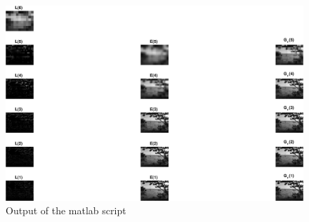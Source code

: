 \documentclass[DIN, pagenumber=false, fontsize=11pt, parskip=half]{scrartcl}
\begin{document}
    \subsection{}
    
    \begin{figure}[H]
        \centering
        \includegraphics[width=\textwidth]{sh05ex02_2.eps}
        \caption{Output of the matlab script}
    \end{figure}
\end{document}

